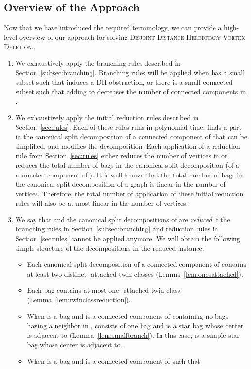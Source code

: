 \documentclass[11pt]{elsarticle}
\newcommand{\disjointDHVD}{\textsc{Disjoint Distance-Hereditary Vertex Deletion}}
\begin{document}
\subsection{Overview of the Approach}
Now that we have introduced the required terminology, we can provide a high-level overview of our approach for solving \disjointDHVD.
\begin{enumerate}
\item We exhaustively apply the branching rules described in Section~\ref{subsec:branching}. 
Branching rules will be applied when  has a small subset  such that  induces a DH obstruction, or 
there is a small connected subset  such that adding  to  decreases the number of connected components in .
\item We exhaustively apply the initial reduction rules described in Section~\ref{sec:rules}. 
Each of these rules runs in polynomial time, finds a part in the canonical split decomposition of a connected component of  that can be simplified, and modifies the decomposition.
Each application of a reduction rule from Section~\ref{sec:rules} 
either reduces the number of vertices in  or reduces the total number of bags in the canonical split decomposition (of a connected component of ). 
It is well known that the total number of bags in the canonical split decomposition of a graph is linear in the number of vertices.
Therefore, the total number of application of these initial reduction rules will also be at most linear in the number of vertices.
\item We say that  and the canonical split decompositions of  are \emph{reduced} if the branching rules in Section~\ref{subsec:branching} and reduction rules in Section~\ref{sec:rules} cannot be applied anymore.
We will obtain the following simple structure of the decompositions in the reduced instance:
\begin{itemize}
\item Each canonical split decomposition  of a connected component of  contains at least two distinct -attached twin classes 
(Lemma~\ref{lem:onesattached}).
\item Each bag contains at most one -attached twin class 
(Lemma~\ref{lem:twinclassreduction}).
\item When  is a bag and  is a connected component of  containing no bags having a neighbor in , 
 consists of one bag and  is a star bag whose center is adjacent to  (Lemma~\ref{lem:smallbranch}).
In this case,  is a simple star bag whose center is adjacent to .
\item When  is a bag and  is a connected component of  such that

\end{itemize}
\end{enumerate}
\end{document}

